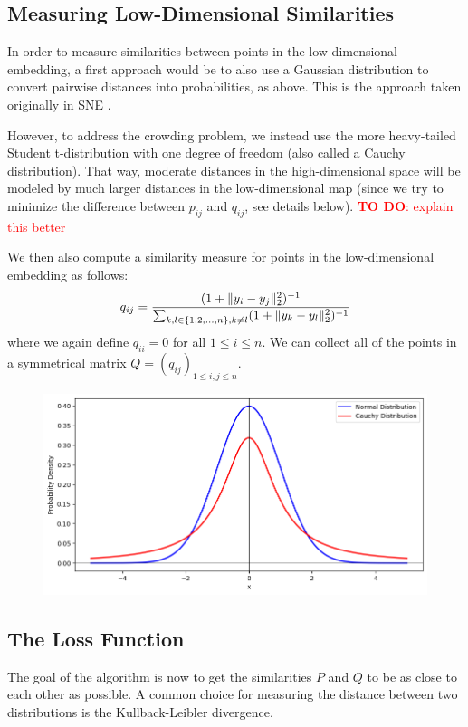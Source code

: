 \subsection{Measuring Low-Dimensional Similarities}
In order to measure similarities between points in the low-dimensional embedding, a first approach would be to also use a Gaussian distribution to convert pairwise distances into probabilities, as above. This is the approach taken originally in SNE \cite{Hinton02}.

However, to address the crowding problem, we instead use the more heavy-tailed Student t-distribution with one degree of freedom (also called a Cauchy distribution). That way, moderate distances in the high-dimensional space will be modeled by much larger distances in the low-dimensional map (since we try to minimize the difference between $p_{ij}$ and $q_{ij}$, see details below). 
\textcolor{red}{\textbf{TO DO}: explain this better}


We then also compute a similarity measure for points in the low-dimensional embedding as follows: 
\begin{equation}
    q_{ij} = \frac{(1+ \lVert y_i - y_j\rVert_2^2)^{-1}}{\sum_{k, l \in \{1,2, \dots, n\}, k \neq l} (1+\lVert y_k - y_l\rVert_2^2)^{-1}}
\end{equation}
where we again define $q_{ii} = 0$ for all $1 \leq i \leq n$. We can collect all of the points in a symmetrical matrix $Q = (q_{ij})_{1 \leq i, j \leq n}$. 


\begin{figure}[h]
    \begin{center}
        \includegraphics[width=0.9\linewidth]{Gaussian_Cauchy.png}
    \end{center}
\end{figure}

\subsection{The Loss Function}
The goal of the algorithm is now to get the similarities $P$ and $Q$ to be as close to each other as possible. 
A common choice for measuring the distance between two distributions is the Kullback-Leibler divergence. 

